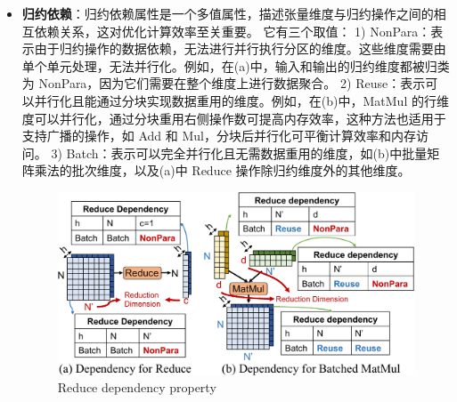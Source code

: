 \begin{itemize}
\item
\textbf{归约依赖}：归约依赖属性是一个多值属性，描述张量维度与归约操作之间的相互依赖关系，这对优化计算效率至关重要。
它有三个取值：
1) NonPara：表示由于归约操作的数据依赖，无法进行并行执行分区的维度。这些维度需要由单个单元处理，无法并行化。例如，在(a)中，输入和输出的归约维度都被归类为 NonPara，因为它们需要在整个维度上进行数据聚合。
2) Reuse：表示可以并行化且能通过分块实现数据重用的维度。例如，在(b)中，MatMul 的行维度可以并行化，通过分块重用右侧操作数可提高内存效率，这种方法也适用于支持广播的操作，如 Add 和 Mul，分块后并行化可平衡计算效率和内存访问。
3) Batch：表示可以完全并行化且无需数据重用的维度，如(b)中批量矩阵乘法的批次维度，以及(a)中 Reduce 操作除归约维度外的其他维度。

\begin{figure}[ht]
    \centering
    \includegraphics[width=0.7\linewidth]{figures/flashtensor/property_definition_dependency.pdf}
    \caption{Reduce dependency property}
    \label{fig:property_definition_dependency}
\end{figure}


\end{itemize}
